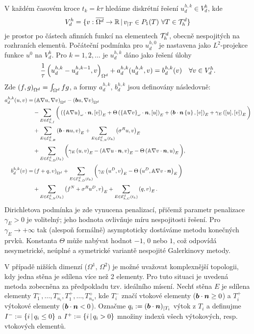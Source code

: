 V každém časovém kroce $t_k=k\tau$ hledáme diskrétní řešení $u_d^{h,k}\in V_d^h$, kde
$$ V_d^h = \{v:\overline{\Omega^d}\to\R\where v_{|T}\in P_1(T)~\forall T\in\Th^d\} $$
je prostor po částech afinních funkcí na elementech $\Th^d$, obecně nespojitých na rozhraních elementů.
Počáteční podmínka pro $u_d^{h,0}$ je nastavena jako $L^2$-projekce funkce $u^0$ na $V_d^h$.
Pro $k=1,2,\ldots$ je $u_d^{h,k}$ dáno jako řešení úlohy
\begin{equation*}
\frac1\tau\sc{u_d^{h,k}-u^{h,k-1}_d}{v}_{\Omega^d} + a^{h,k}_d(u^{h,k}_d,v) = b^{h,k}_d(v) \quad \forall v\in V^h_d.
\end{equation*}
Zde $\sc{f}{g}_{\Omega^d}=\int_{\Omega^d} f g$, a formy $a^{h,k}_d$, $b^{h,k}_d$ jsou definovány následovně:
\begin{align*}
a^{h,k}_d(u,v) = &\sc{\tn A\nabla u}{\nabla v}_{\Omega^d}
- \sc{\bb u}{\nabla v}_{\Omega^d}\\
&- \sum_{E\in\Ehint^d}\bigg(\sc{\wavg{\tn A\nabla u}\cdot\n}{\jmp{v}}_E + \Theta\sc{\wavg{\tn A\nabla v}\cdot\n}{\jmp{u}}_E
+ \sc{\bb\cdot\n\avg{u}}{\jmp{v}}_E
+ \gamma_E\sc{\jmp{u}}{\jmp{v}}_E\bigg)\\
&+ \sum_{E\in\Ehb^d}\sc{\bb\cdot\n u}{v}_E
+ \sum_{E\in\Ehneu^d(t_k)}\sc{\sigma^R u}{v}_E\\
&+ \sum_{E\in\Ehdir^d(t_k)}\bigg(\gamma_E\sc{u}{v}_E - \sc{\tn A\nabla u\cdot\nn}{v}_E - \Theta\sc{\tn A\nabla v\cdot\nn}{u}_E\bigg),\\
% 
b^{h,k}_d(v) = &\sc{f+q}{v}_{\Omega^d} + \sum_{E\in\Ehdir^d(t_k)}\bigg(\gamma_E\sc{u^D}{v}_E - \Theta\sc{u^D}{\tn A\nabla v\cdot\nn}_E\bigg)\\
&+ \sum_{E\in\Ehneu^d(t_k)}\sc{f^N+\sigma^R u^D}{v}_E
+ \sum_{E\in\Ehcom^d(t_k)}\sc{q}{v}_E.
\end{align*}
Dirichletova podmínka je zde vynucena penalizací, přičemž parametr penalizace $\gamma_E>0$ je volitelný; jeho hodnota ovlivňuje míru nespojitosti řešení. Pro $\gamma_E\to+\infty$ tak (alespoň formálně) asymptoticky dostáváme metodu konečných prvků.
Konstanta $\Theta$ může nabývat hodnot $-1$, $0$ nebo $1$, což odpovídá nesymetrické, neúplné a symetrické variantě nespojité Galerkinovy metody.

V případě nižších dimenzí ($\Omega^1$, $\Omega^2$) je možné uvažovat komplexnější topologii, kdy jedna stěna je sdílena více než 2 elementy.
Pro tuto situaci je uvedená metoda zobecněna za předpokladu tzv. ideálního mísení.
Nechť stěna $E$ je sdílena elementy $T_1^-,\ldots,T_{n_i}^-,T_1^+,\ldots,T_{n_o}^+$, kde $T_i^-$ značí vtokové elementy ($\bb\cdot\nn\ge0$) a $T_i^+$ výtokové elementy ($\bb\cdot\nn<0$).
Označme $q_i:=(\bb\cdot\nn)_{|T_i}$ výtok z $T_i$ a definujme $I^-:=\{i\where q_i\le 0\}$ a $I^+:=\{i\where q_i>0\}$ množiny indexů všech výtokových, resp. vtokových elementů.

